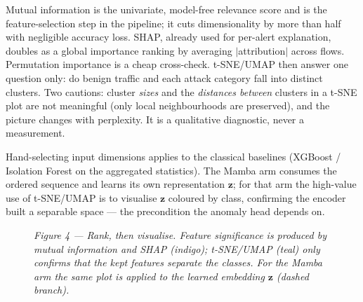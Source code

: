 \documentclass[11pt,a4paper]{article}
\begin{document}
Mutual information is the univariate, model-free relevance score and is the feature-selection step in the pipeline; it cuts dimensionality by more than half with negligible accuracy loss. SHAP, already used for per-alert explanation, doubles as a global importance ranking by averaging $|$attribution$|$ across flows. Permutation importance is a cheap cross-check. t-SNE/UMAP then answer one question only: do benign traffic and each attack category fall into distinct clusters. Two cautions: cluster \emph{sizes} and the \emph{distances between} clusters in a t-SNE plot are not meaningful (only local neighbourhoods are preserved), and the picture changes with perplexity. It is a qualitative diagnostic, never a measurement.

Hand-selecting input dimensions applies to the classical baselines (XGBoost / Isolation Forest on the aggregated statistics). The Mamba arm consumes the ordered sequence and learns its own representation $\mathbf{z}$; for that arm the high-value use of t-SNE/UMAP is to visualise $\mathbf{z}$ coloured by class, confirming the encoder built a separable space --- the precondition the anomaly head depends on.

\begin{figure}[H]
\centering
{}
\caption*{\small\textit{Figure 4 --- Rank, then visualise. Feature significance is produced by mutual information and SHAP (indigo); t-SNE/UMAP (teal) only confirms that the kept features separate the classes. For the Mamba arm the same plot is applied to the learned embedding $\mathbf{z}$ (dashed branch).}}
\end{figure}
\end{document}
